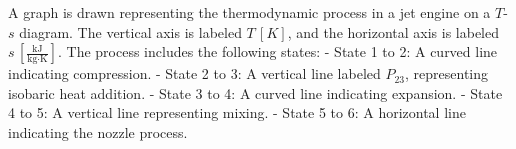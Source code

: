 A graph is drawn representing the thermodynamic process in a jet engine on a \( T \)-\( s \) diagram. The vertical axis is labeled \( T \, [K] \), and the horizontal axis is labeled \( s \, \left[\frac{\text{kJ}}{\text{kg·K}}\right] \). The process includes the following states:  
- State 1 to 2: A curved line indicating compression.  
- State 2 to 3: A vertical line labeled \( P_{23} \), representing isobaric heat addition.  
- State 3 to 4: A curved line indicating expansion.  
- State 4 to 5: A vertical line representing mixing.  
- State 5 to 6: A horizontal line indicating the nozzle process.